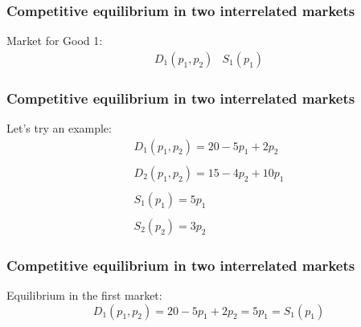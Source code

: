 \documentclass[xcolor=pdftex,dvipsnames]{beamer}
\begin{document}
\begin{frame}
  \frametitle{Competitive equilibrium in two interrelated markets}
  Market for Good 1:
  \[
  \begin{array}{cc}
    D_1(p_1,p_2) & S_1(p_1)      
    \end{array}
  \]






\end{frame}
\begin{frame}
\frametitle{Competitive equilibrium in two interrelated markets}
Let's try an example:
\[
\begin{array}{c}
D_1(p_1,p_2)  = 20 - 5p_1 + 2p_2  \\\\
D_2(p_1,p_2)  = 15 - 4p_2 + 10p_1  \\\\
S_1(p_1) = 5p_1 \\\\
S_2(p_2)  = 3p_2
\end{array}
\]
\end{frame}


\begin{frame}
\frametitle{Competitive equilibrium in two interrelated markets}
Equilibrium in the first market:
\[
D_1(p_1,p_2)  = 20-5p_1 + 2p_2 = 5p_1 = S_1(p_1)
\]


\end{frame}
\end{document}
